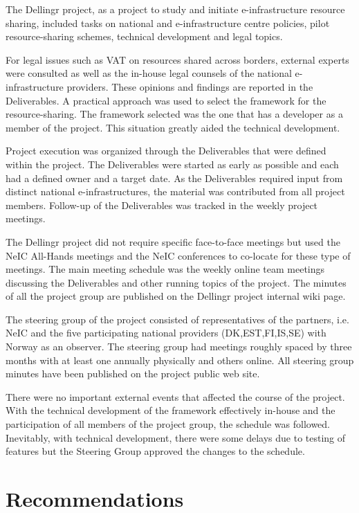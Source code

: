 \documentclass{article}
\newcommand{\dell}{Dellingr\xspace}
\begin{document}
The \dell project, as a project to study and initiate e-infrastructure resource sharing, included tasks on national and e-infrastructure centre policies, pilot resource-sharing schemes, technical development and legal topics.

For legal issues such as VAT on resources shared across borders, external experts were consulted as well as the in-house legal
counsels of the national e-infrastructure providers.
These opinions and findings are reported in the Deliverables.
A practical approach was used to select the framework for the resource-sharing.
The framework selected was the one that has a developer as a member of the project.
This situation greatly aided the technical development.

Project execution was organized through the Deliverables that were defined within the project.
The Deliverables were started as early as possible and each had a defined owner and a target date.
As the Deliverables required input from distinct national e-infrastructures, the material was contributed from all project members.
Follow-up of the Deliverables was tracked in the weekly project meetings.

The \dell project did not require specific face-to-face meetings but used the NeIC All-Hands meetings and the NeIC conferences
to co-locate for these type of meetings.
The main meeting schedule was the weekly online team meetings discussing the Deliverables and other running topics of the project.
The minutes of all the project group are published on the \dell project internal wiki page.

The steering group of the project consisted of representatives of the partners, i.e. NeIC and the five participating national providers
(DK,EST,FI,IS,SE) with Norway as an observer.
The steering group had meetings roughly spaced by three months with at least one annually physically and others online.
All steering group minutes have been published on the project public web site.

There were no important external events that affected the course of the project.
With the technical development of the framework effectively in-house and the participation
of all members of the project group, the schedule was followed.
Inevitably, with technical development, there were some delays due to testing of features but
the Steering Group approved the changes to the schedule.

\section{Recommendations}
\end{document}
